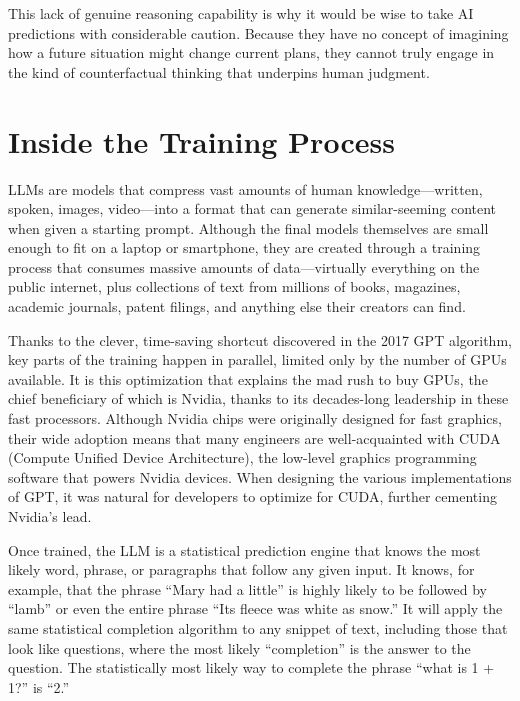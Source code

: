 \documentclass[
  Letterpaper,
]{scrbook}
\begin{document}
This lack of genuine reasoning capability is why it would be wise to
take AI predictions with considerable caution. Because they have no
concept of imagining how a future situation might change current plans,
they cannot truly engage in the kind of counterfactual thinking that
underpins human judgment.

\section{Inside the Training Process}\label{inside-the-training-process}

LLMs are models that compress vast amounts of human knowledge---written,
spoken, images, video---into a format that can generate similar-seeming
content when given a starting prompt. Although the final models
themselves are small enough to fit on a laptop or smartphone, they are
created through a training process that consumes massive amounts of
data---virtually everything on the public internet, plus collections of
text from millions of books, magazines, academic journals, patent
filings, and anything else their creators can find.

Thanks to the clever, time-saving shortcut discovered in the 2017 GPT
algorithm, key parts of the training happen in parallel, limited only by
the number of GPUs available. It is this optimization that explains the
mad rush to buy GPUs, the chief beneficiary of which is Nvidia, thanks
to its decades-long leadership in these fast processors. Although Nvidia
chips were originally designed for fast graphics, their wide adoption
means that many engineers are well-acquainted with CUDA (Compute Unified
Device Architecture), the low-level graphics programming software that
powers Nvidia devices. When designing the various implementations of
GPT, it was natural for developers to optimize for CUDA, further
cementing Nvidia's lead.

Once trained, the LLM is a statistical prediction engine that knows the
most likely word, phrase, or paragraphs that follow any given input. It
knows, for example, that the phrase ``Mary had a little'' is highly
likely to be followed by ``lamb'' or even the entire phrase ``Its fleece
was white as snow.'' It will apply the same statistical completion
algorithm to any snippet of text, including those that look like
questions, where the most likely ``completion'' is the answer to the
question. The statistically most likely way to complete the phrase
``what is 1 + 1?'' is ``2.''
\end{document}
